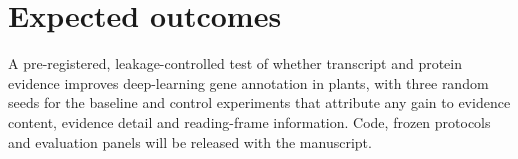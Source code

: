 \documentclass[11pt]{article}
\begin{document}
\section{Expected outcomes}
A pre-registered, leakage-controlled test of whether transcript and protein evidence improves deep-learning gene annotation in plants, with three random seeds for the baseline and control experiments that attribute any gain to evidence content, evidence detail and reading-frame information. Code, frozen protocols and evaluation panels will be released with the manuscript.
\end{document}
